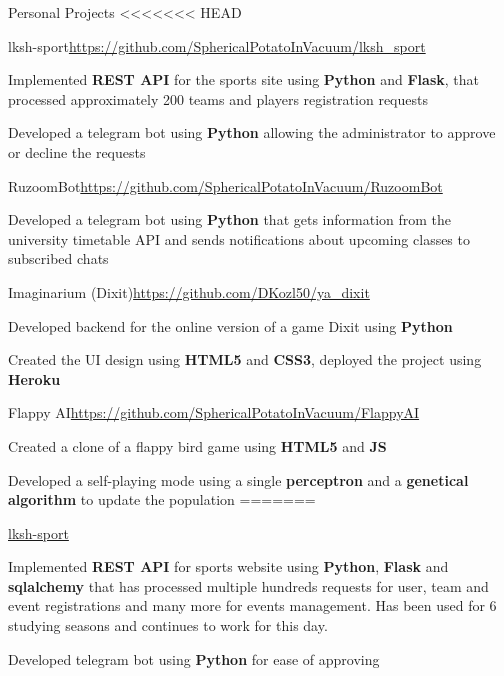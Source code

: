 \documentclass{./resume} %
\begin{document}
\begin{rSection}{Personal Projects}
<<<<<<< HEAD
    \begin{rSubsection}{lksh-sport}{\url{https://github.com/SphericalPotatoInVacuum/lksh_sport}}{}{}
        \item Implemented \textbf{REST API} for the sports site using \textbf{Python} and \textbf{Flask}, that processed approximately 200 teams and players registration requests
        \item Developed a telegram bot using \textbf{Python} allowing the administrator to approve or decline the requests
    \end{rSubsection}
    \begin{rSubsection}{RuzoomBot}{\url{https://github.com/SphericalPotatoInVacuum/RuzoomBot}}{}{}
        \item Developed a telegram bot using \textbf{Python} that gets information from the university timetable API and sends notifications about upcoming classes to subscribed chats
    \end{rSubsection}
    \begin{rSubsection}{Imaginarium (Dixit)}{\url{https://github.com/DKozl50/ya_dixit}}{}{}
        \item Developed backend for the online version of a game Dixit using \textbf{Python}
        \item Created the UI design using \textbf{HTML5} and \textbf{CSS3}, deployed the project using \textbf{Heroku}
    \end{rSubsection}
    \begin{rSubsection}{Flappy AI}{\url{https://github.com/SphericalPotatoInVacuum/FlappyAI}}{}{}
        \item Created a clone of a flappy bird game using \textbf{HTML5} and \textbf{JS}
        \item Developed a self-playing mode using a single \textbf{perceptron} and a \textbf{genetical algorithm} to update the population
=======
    \begin{rSubsection}{\href{https://github.com/SphericalPotatoInVacuum/lksh_sport}{lksh-sport}}{}{}{}
        \item Implemented \textbf{REST API} for sports website using
        \textbf{Python}, \textbf{Flask} and \textbf{sqlalchemy} that
        has processed multiple hundreds requests for user, team and event registrations
        and many more for events management. Has been used for 6 studying seasons and continues to work for this day.
        \item Developed telegram bot using \textbf{Python} for ease of approving

\end{rSubsection}
\end{rSubsection}
\end{rSection}
\end{document}
